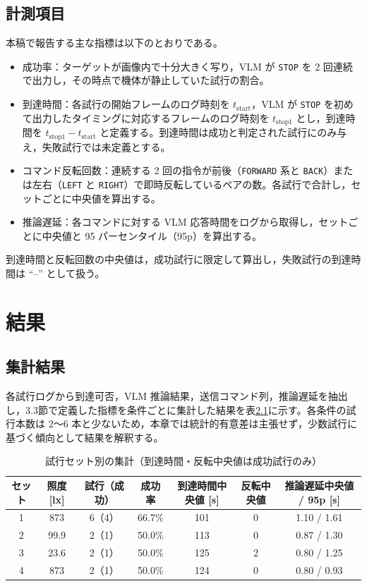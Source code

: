 \documentclass[a4paper,11pt]{ltjsreport}
\begin{document}
\section{計測項目}
本稿で報告する主な指標は以下のとおりである。
\begin{itemize}
  \item 成功率：ターゲットが画像内で十分大きく写り，VLM が \texttt{STOP} を 2 回連続で出力し，その時点で機体が静止していた試行の割合。
  \item 到達時間：各試行の開始フレームのログ時刻を $t_{\mathrm{start}}$，VLM が \texttt{STOP} を初めて出力したタイミングに対応するフレームのログ時刻を $t_{\mathrm{stop1}}$ とし，到達時間を $t_{\mathrm{stop1}}-t_{\mathrm{start}}$ と定義する。到達時間は成功と判定された試行にのみ与え，失敗試行では未定義とする。
  \item コマンド反転回数：連続する 2 回の指令が前後（\texttt{FORWARD} 系と \texttt{BACK}）または左右（\texttt{LEFT} と \texttt{RIGHT}）で即時反転しているペアの数。各試行で合計し，セットごとに中央値を算出する。
  \item 推論遅延：各コマンドに対する VLM 応答時間をログから取得し，セットごとに中央値と 95 パーセンタイル（95p）を算出する。
\end{itemize}
到達時間と反転回数の中央値は，成功試行に限定して算出し，失敗試行の到達時間は ``--'' として扱う。

\chapter{結果}
\label{chap:results}
\section{集計結果}
各試行ログから到達可否，VLM 推論結果，送信コマンド列，推論遅延を抽出し，3.3節で定義した指標を条件ごとに集計した結果を表\ref{tab:summary}に示す。各条件の試行本数は 2〜6 本と少ないため，本章では統計的有意差は主張せず，少数試行に基づく傾向として結果を解釈する。

\begin{table}[htbp]
  \centering
  \caption{試行セット別の集計（到達時間・反転中央値は成功試行のみ）}
  \label{tab:summary}
  \begin{tabular}{|c|c|c|c|c|c|c|}
    \hline
    セット & 照度 [lx] & 試行（成功） & 成功率 & 到達時間中央値 [s] & 反転中央値 & 推論遅延中央値 / 95p [s] \\
    \hline
    1 & 873 & 6（4） & 66.7\% & 101 & 0 & 1.10 / 1.61 \\
    2 & 99.9 & 2（1） & 50.0\% & 113 & 0 & 0.87 / 1.30 \\
    3 & 23.6 & 2（1） & 50.0\% & 125 & 2 & 0.80 / 1.25 \\
    4 & 873 & 2（1） & 50.0\% & 124 & 0 & 0.80 / 0.93 \\
    \hline
  \end{tabular}
\end{table}
\end{document}
